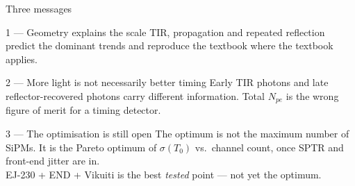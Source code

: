 \documentclass[aspectratio=169,9pt]{beamer}
\newcommand{\sigT}{\sigma(T_0)}
\begin{document}
\begin{frame}{Three messages}
  \vspace{6pt}
  \begin{block}{1 — Geometry explains the scale}
    {\small TIR, propagation and repeated reflection predict the dominant trends
    and reproduce the textbook where the textbook applies.}
  \end{block}
  \vspace{4pt}
  \begin{block}{2 — More light is not necessarily better timing}
    {\small Early TIR photons and late reflector-recovered photons carry different
    information.  Total $N_{pe}$ is the wrong figure of merit for a timing detector.}
  \end{block}
  \vspace{4pt}
  \begin{alertblock}{3 — The optimisation is still open}
    {\small The optimum is not the maximum number of SiPMs.  It is the Pareto
    optimum of $\sigT$ vs.\ channel count, once SPTR and front-end jitter are in.\\[4pt]
    EJ-230 + END + Vikuiti is the best \emph{tested} point — not yet the optimum.}
  \end{alertblock}
\end{frame}
\end{document}
